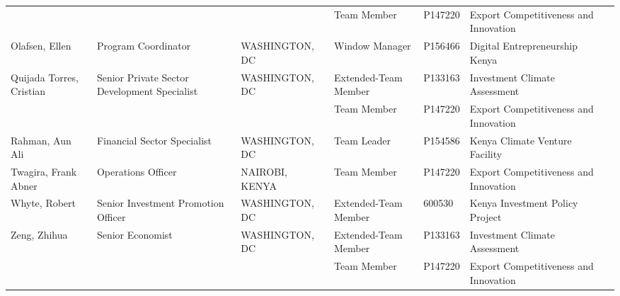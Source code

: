 \documentclass{article}\usepackage[]{graphicx}\usepackage[]{color}
\begin{document}
\begin{minipage}[b]{0.99\textwidth}
{\begin{longtable}{>{\raggedright}p{1.4in}>{\raggedright}p{1in}>{\raggedright}p{1in}>{\raggedright}p{1in}l>{\raggedright}p{1.5in}l}
   &  &  & Team Member & P147220 & Export Competitiveness and Innovation &  \\ 
  Olafsen, Ellen & Program Coordinator & WASHINGTON, DC & Window Manager & P156466 & Digital Entrepreneurship Kenya &  \\ 
  Quijada Torres, Cristian & Senior Private Sector Development Specialist & WASHINGTON, DC & Extended-Team Member & P133163 & Investment Climate Assessment &  \\ 
   &  &  & Team Member & P147220 & Export Competitiveness and Innovation &  \\ 
  Rahman, Aun Ali & Financial Sector Specialist & WASHINGTON, DC & Team Leader & P154586 & Kenya Climate Venture Facility &  \\ 
  Twagira, Frank Abner & Operations Officer & NAIROBI, KENYA & Team Member & P147220 & Export Competitiveness and Innovation &  \\ 
  Whyte, Robert & Senior Investment Promotion Officer & WASHINGTON, DC & Extended-Team Member & 600530 & Kenya Investment Policy Project &  \\ 
  Zeng, Zhihua & Senior Economist & WASHINGTON, DC & Extended-Team Member & P133163 & Investment Climate Assessment &  \\ 
   &  &  & Team Member & P147220 & Export Competitiveness and Innovation &  \\ 
  \hline
\end{longtable}
}

     \vspace*{0.5cm}
\end{minipage}

\end{document}
